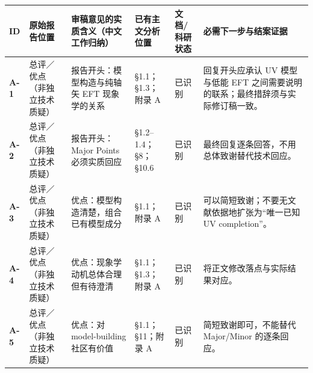 \documentclass[
  chinese,
  UTF8]{ctexart}
\newcounter{none} %
\begin{document}
{\def\LTcaptype{none} %
\begin{longtable}[]{@{}
  >{\raggedright\arraybackslash}p{}
  >{\raggedright\arraybackslash}p{}
  >{\raggedright\arraybackslash}p{}
  >{\raggedright\arraybackslash}p{}
  >{\raggedright\arraybackslash}p{}
  >{\raggedright\arraybackslash}p{}@{}}
\toprule\noalign{}
\begin{minipage}[b]{\linewidth}\raggedright
ID
\end{minipage} & \begin{minipage}[b]{\linewidth}\raggedright
原始报告位置
\end{minipage} & \begin{minipage}[b]{\linewidth}\raggedright
审稿意见的实质含义（中文工作归纳）
\end{minipage} & \begin{minipage}[b]{\linewidth}\raggedright
已有主文分析位置
\end{minipage} & \begin{minipage}[b]{\linewidth}\raggedright
文档/科研状态
\end{minipage} & \begin{minipage}[b]{\linewidth}\raggedright
必需下一步与结案证据
\end{minipage} \\
\midrule\noalign{}
\endhead
\bottomrule\noalign{}
\endlastfoot
\textbf{A-1} & 总评／优点（非独立技术质疑） & 报告开头：模型构造与纯轴矢
EFT 现象学的关系 & §1.1；§1.3；附录 A & 已识别 & 回复开头应承认 UV
模型与低能 EFT 之间需要说明的联系；最终措辞须与实际修订稿一致。 \\
\textbf{A-2} & 总评／优点（非独立技术质疑） & 报告开头：Major Points
必须实质回应 & §1.2--1.4；§8；§10.6 & 已识别 &
最终回复逐条回答，不用总体致谢替代技术回应。 \\
\textbf{A-3} & 总评／优点（非独立技术质疑） &
优点：模型构造清楚，组合已有模型成分 & §1.1；附录 A & 已识别 &
可以简短致谢；不要无文献依据地扩张为``唯一已知 UV completion''。 \\
\textbf{A-4} & 总评／优点（非独立技术质疑） &
优点：现象学动机总体合理但有待澄清 & §1.1；§1.3；附录 A & 已识别 &
将正文修改落点与实际结果对应。 \\
\textbf{A-5} & 总评／优点（非独立技术质疑） & 优点：对 model-building
社区有价值 & §1.1；§11；附录 A & 已识别 & 简短致谢即可，不能替代
Major/Minor 的逐条回应。 \\
\end{longtable}
}
\end{document}
